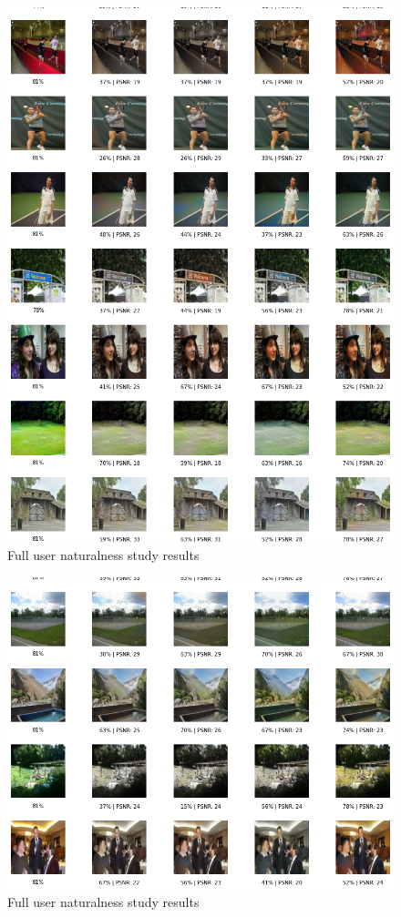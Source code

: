 \begin{figure}[H]
    \centering
    \includegraphics[width=1\columnwidth]{sections/appendix/study_result_part3.png}
    \caption{Full user naturalness study results}
    \label{fig:my_label}
\end{figure}

\begin{figure}[H]
    \centering
    \includegraphics[width=1\columnwidth]{sections/appendix/study_result_part4.png}
    \caption{Full user naturalness study results}
    \label{fig:my_label}
\end{figure}

